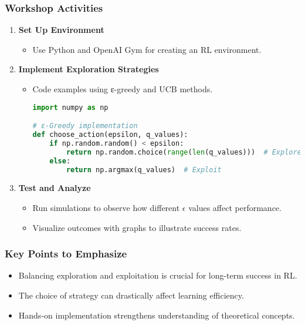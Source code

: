 \documentclass[aspectratio=169]{beamer}
\begin{document}
\begin{frame}[fragile]
    \frametitle{Workshop Activities}
    \begin{enumerate}
        \item \textbf{Set Up Environment}
            \begin{itemize}
                \item Use Python and OpenAI Gym for creating an RL environment.
            \end{itemize}
        
        \item \textbf{Implement Exploration Strategies}
            \begin{itemize}
                \item Code examples using ε-greedy and UCB methods.
                \begin{lstlisting}[language=Python]
import numpy as np

# ε-Greedy implementation
def choose_action(epsilon, q_values):
    if np.random.random() < epsilon:
        return np.random.choice(range(len(q_values)))  # Explore
    else:
        return np.argmax(q_values)  # Exploit
                \end{lstlisting}
            \end{itemize}
        
        \item \textbf{Test and Analyze}
            \begin{itemize}
                \item Run simulations to observe how different $\epsilon$ values affect performance.
                \item Visualize outcomes with graphs to illustrate success rates.
            \end{itemize}
    \end{enumerate}
\end{frame}

\begin{frame}[fragile]
    \frametitle{Key Points to Emphasize}
    \begin{itemize}
        \item Balancing exploration and exploitation is crucial for long-term success in RL.
        \item The choice of strategy can drastically affect learning efficiency.
        \item Hands-on implementation strengthens understanding of theoretical concepts.
    \end{itemize}
\end{frame}
\end{document}
